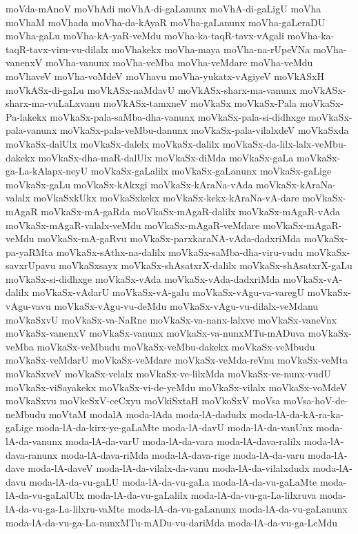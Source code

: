 {moVda-mAnoV
moVhAdi
moVhA-di-gaLanunx
moVhA-di-gaLigU
moVha
moVhaM
moVhada
moVha-da-kAyaR
moVha-gaLanunx
moVha-gaLeraDU
moVha-gaLu
moVha-kA-yaR-veMdu
moVha-ka-taqR-tavx-vAgali
moVha-ka-taqR-tavx-viru-vu-dilalx
moVhakekx
moVha-maya
moVha-na-rUpeVNa
moVha-vanenxV
moVha-vanunx
moVha-veMba
moVha-veMdare
moVha-veMdu
moVhaveV
moVha-voMdeV
moVhavu
moVha-yukatx-vAgiyeV
moVkASxH
moVkASx-di-gaLu
moVkASx-naMdavU
moVkASx-sharx-ma-vanunx
moVkASx-sharx-ma-vuLaLxvanu
moVkASx-tamxneV
moVkaSx
moVkaSx-Pala
moVkaSx-Pa-lakekx
moVkaSx-pala-saMba-dha-vanunx
moVkaSx-pala-si-didhxge
moVkaSx-pala-vanunx
moVkaSx-pala-veMbu-danunx
moVkaSx-pala-vilalxdeV
moVkaSxda
moVkaSx-dalUlx
moVkaSx-dalelx
moVkaSx-dalilx
moVkaSx-da-lilx-lalx-veMbu-dakekx
moVkaSx-dha-maR-dalUlx
moVkaSx-diMda
moVkaSx-gaLa
moVkaSx-ga-La-kAlapx-neyU
moVkaSx-gaLalilx
moVkaSx-gaLanunx
moVkaSx-gaLige
moVkaSx-gaLu
moVkaSx-kAkxgi
moVkaSx-kAraNa-vAda
moVkaSx-kAraNa-valalx
moVkaSxkUkx
moVkaSxkekx
moVkaSx-kekx-kAraNa-vA-dare
moVkaSx-mAgaR
moVkaSx-mA-gaRda
moVkaSx-mAgaR-dalilx
moVkaSx-mAgaR-vAda
moVkaSx-mAgaR-valalx-veMdu
moVkaSx-mAgaR-veMdare
moVkaSx-mAgaR-veMdu
moVkaSx-mA-gaRvu
moVkaSx-parxkaraNA-vAda-dadxriMda
moVkaSx-pa-yaRMta
moVkaSx-sAthx-na-dalilx
moVkaSx-saMba-dha-viru-vudu
moVkaSx-savxrUpavu
moVkaSxsayx
moVkaSx-shAsatxrX-dalilx
moVkaSx-shAsatxrX-gaLu
moVkaSx-si-didhxge
moVkaSx-vAda
moVkaSx-vAda-dadxriMda
moVkaSx-vA-dalilx
moVkaSx-vAdarU
moVkaSx-vA-galu
moVkaSx-vAgu-va-varegU
moVkaSx-vAgu-vavu
moVkaSx-vAgu-vu-deMdu
moVkaSx-vAgu-vu-dilalx-veMdanu
moVkaSxvU
moVkaSx-va-NaRne
moVkaSx-va-nanx-lalxve
moVkaSx-vaneVnx
moVkaSx-vanenxV
moVkaSx-vanunx
moVkaSx-va-nunxMTu-mADuva
moVkaSx-veMba
moVkaSx-veMbudu
moVkaSx-veMbu-dakekx
moVkaSx-veMbudu
moVkaSx-veMdarU
moVkaSx-veMdare
moVkaSx-veMda-reVnu
moVkaSx-veMta
moVkaSxveV
moVkaSx-velalx
moVkaSx-ve-lilxMda
moVkaSx-ve-nunx-vudU
moVkaSx-viSayakekx
moVkaSx-vi-de-yeMdu
moVkaSx-vilalx
moVkaSx-voMdeV
moVkaSxvu
moVkeSxV-ceCxyu
moVkiSxtaH
moVkoSxV
moVsa
moVsa-hoV-de-neMbudu
moVtaM
modalA
moda-lAda
moda-lA-dadudx
moda-lA-da-kA-ra-ka-gaLige
moda-lA-da-kirx-ye-gaLaMte
moda-lA-davU
moda-lA-da-vanUnx
moda-lA-da-vanunx
moda-lA-da-varU
moda-lA-da-vara
moda-lA-dava-ralilx
moda-lA-dava-ranunx
moda-lA-dava-riMda
moda-lA-dava-rige
moda-lA-da-varu
moda-lA-dave
moda-lA-daveV
moda-lA-da-vilalx-da-vanu
moda-lA-da-vilalxdudx
moda-lA-davu
moda-lA-da-vu-gaLU
moda-lA-da-vu-gaLa
moda-lA-da-vu-gaLaMte
moda-lA-da-vu-gaLalUlx
moda-lA-da-vu-gaLalilx
moda-lA-da-vu-ga-La-lilxruva
moda-lA-da-vu-ga-La-lilxru-vaMte
moda-lA-da-vu-gaLanunx
moda-lA-da-vu-gaLanunx
moda-lA-da-vu-ga-La-nunxMTu-mADu-vu-dariMda
moda-lA-da-vu-ga-LeMdu
}
